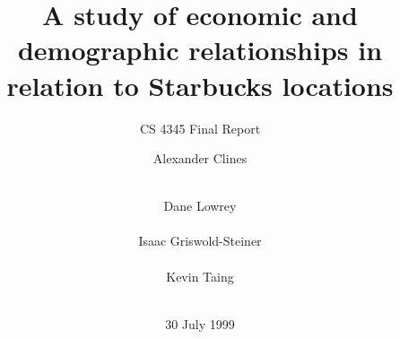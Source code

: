 \documentclass{sigkddExp}
\begin{document}
%

\title{A study of economic and demographic relationships in relation to Starbucks locations}
\subtitle{CS 4345 Final Report}
%

%


\author{
%
\alignauthor Alexander Clines \\
       \\
\and
\alignauthor Dane Lowrey \\
      \\
\alignauthor Isaac Griswold-Steiner \\
      \\
\alignauthor Kevin Taing \\
      \\
}
\date{30 July 1999}
\maketitle
\begin{abstract}
\blindtext
\end{abstract}
\end{document}
